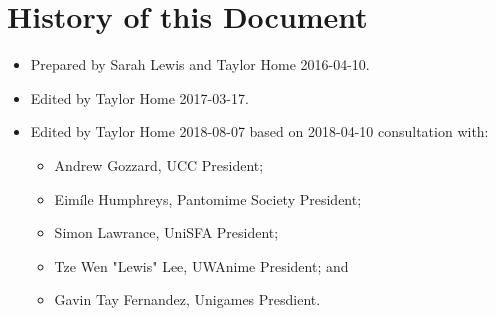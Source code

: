 \documentclass[a4paper]{article}
\begin{document}
\appendixpage

\appendix \section{History of this Document} \label{app:history}

\begin{itemize}
	\item[] Prepared by Sarah Lewis and Taylor Home 2016-04-10.
    \item[] Edited by Taylor Home 2017-03-17.
    \item[] Edited by Taylor Home 2018-08-07 based on 2018-04-10 consultation with:
    \begin{itemize}
        \item Andrew Gozzard, UCC President;
        \item Eim\'ile Humphreys, Pantomime Society President;
        \item Simon Lawrance, UniSFA President;
        \item Tze Wen "Lewis" Lee, UWAnime President; and
        \item Gavin Tay Fernandez, Unigames Presdient.
    \end{itemize}
\end{itemize}
\end{document}
